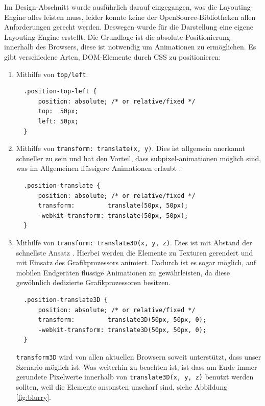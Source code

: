 \documentclass[12pt,twoside]{book}
\begin{document}
Im Design-Abschnitt wurde ausführlich darauf eingegangen, was die Layouting-Engine alles leisten muss, leider konnte keine der OpenSource-Bibliotheken allen Anforderungen gerecht werden. Deswegen wurde für die Darstellung eine eigene Layouting-Engine erstellt.
Die Grundlage ist die absolute Positionierung innerhalb des Browsers, diese ist notwendig um Animationen zu ermöglichen. Es gibt verschiedene Arten, DOM-Elemente durch CSS zu positionieren:

\begin{enumerate}
  \item Mithilfe von \texttt{top/left}.\\
  \begin{verbatim}
  .position-top-left {
      position: absolute; /* or relative/fixed */
      top:  50px;
      left: 50px;
  }
  \end{verbatim}
  \item Mithilfe von \texttt{transform: translate(x, y)}. Dies ist allgemein anerkannt schneller zu sein und hat den Vorteil, dass subpixel-animationen möglich sind, was im Allgemeinen flüssigere Animationen erlaubt \cite{translate}. \\
  \begin{verbatim}
  .position-translate {
      position: absolute; /* or relative/fixed */
      transform:         translate(50px, 50px);
      -webkit-transform: translate(50px, 50px);
  }
  \end{verbatim}
  \item Mithilfe von \texttt{transform: translate3D(x, y, z)}. Dies ist mit Abstand der schnellste Ansatz \cite{translate3dvstranslate}. Hierbei werden die Elemente zu Texturen gerendert und mit Einsatz des Grafikprozessors animiert. Dadurch ist es sogar möglich, auf mobilen Endgeräten flüssige Animationen zu gewährleisten, da diese gewöhnlich dedizierte Grafikprozessoren besitzen.
  \begin{verbatim}
  .position-translate3D {
      position: absolute; /* or relative/fixed */
      transform:         translate3D(50px, 50px, 0);
      -webkit-transform: translate3D(50px, 50px, 0);
  }
  \end{verbatim}
  \texttt{transform3D} wird von allen aktuellen Browsern soweit unterstützt, dass unser Szenario möglich ist\cite{transform3d}. Was weiterhin zu beachten ist, ist dass am Ende immer gerundete Pixelwerte innerhalb von \texttt{translate3D(x, y, z)} benutzt werden sollten, weil die Elemente ansonsten unscharf sind, siehe Abbildung \ref{fig:blurry}.


\end{enumerate}
\end{document}
